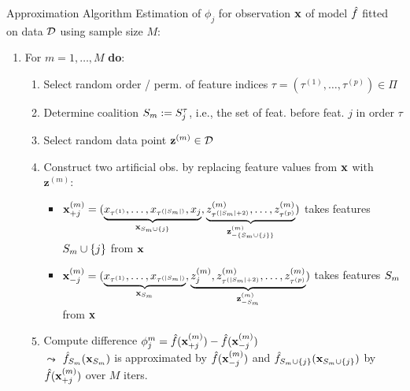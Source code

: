\documentclass[11pt,compress,t,notes=noshow, aspectratio=169, xcolor=table]{beamer}
\begin{document}
\begin{frame}{Approximation Algorithm }
Estimation of $\phi_j$ for observation $\xv$ of model $\fh$ fitted on data $\D$ using sample size $M$:
  \begin{enumerate}[<+->]
      \item For $m = 1, \ldots, M$ \textbf{do}:
      \begin{enumerate}
        \item Select random order / perm. of feature indices $\tau = (\tau^{(1)}, \ldots, \tau^{(p)}) \in \Pi$
        \item Determine coalition $\Sm := \Stau$, i.e., the set of feat. before feat. $j$ in order $\tau$
        \item Select random data point $\mathbf{z}^{(m)} \in \D$%
        \item Construct two artificial obs. by replacing feature values from $\xv$ with $\mathbf{z}^{(m)}$:
          \begin{itemize}
          \setlength\itemsep{.5em}
            \item %
            $ \xjp  = (\underbrace{x_{\tau^{(1)}}, \ldots, x_{\tau^{(|\Sm|)}}, x_{j}}_{\xv_{\Smj}}, \underbrace{z_{\tau^{(|\Sm|+2)}}^{(m)} , \ldots, z_{\tau^{(p)}}^{(m)}}_{\mathbf{z}^{(m)}_{\minusSmj}} )$
            takes features $\Smj$ from $\xv$
            \item %
            $ \xjm = (\underbrace{x_{\tau^{(1)}}, \ldots, x_{\tau^{(|\Sm|)}}}_{\xv_{\Sm}}, \underbrace{z_{j}^{(m)} , z_{\tau^{(|\Sm|+2)}}^{(m)} , \ldots, z_{\tau^{(p)}}^{(m)}}_{\mathbf{z}^{(m)}_{-\Sm}} )$
            takes features $\Sm$ from $\xv$
          \end{itemize}
        \item Compute difference $\phi_j^m = \fh(\xjp) - \fh(\xjm)$ \\
        $\leadsto$ $\fh_{\Sm}(\xv_{\Sm})$ is approximated by $\fh(\xv_{-j}^{(m)})$ and  $\fh_{\Smj}(\xv_{\Smj})$ by  $\fh(\xv_{+j}^{(m)})$ over $M$ iters.
        \end{enumerate}
        

\end{enumerate}
\end{frame}
\end{document}
